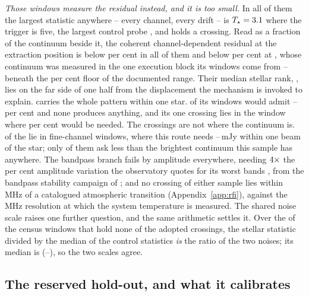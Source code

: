 \emph{Those windows measure the residual instead, and it is too small.} In
all \CxNAdmit{} of them the largest statistic anywhere -- every channel,
every drift -- is $T_\star=3.1$ where the trigger is five, the
largest control probe \CxAdmitCtrlHi, and \CxAdmitNCrossWord{} holds a
crossing. Read as
a fraction of the continuum beside it, the coherent channel-dependent
residual at the extraction position is below \CxResidHiPct{} per cent in all
of them and below \CxResidBestPct{} per cent at \CxResidBestStar, whose
continuum was measured in the one execution block its windows come from --
beneath the \CdSpecTsysLo{} per cent floor of the documented range. Their
median stellar rank, \CxAdmitRankMed, lies on the far side of one half from
the displacement the mechanism is invoked to explain. \CxOneStar{} carries
the whole pattern within one star. \CxOneStarNAdmit{} of its windows would
admit \CxOneStarEpsLoPct--\CxOneStarEpsHiPct{} per cent and none produces
anything, and its one crossing lies in the window where
\CxOneStarCrossEpsPct{} per cent would be needed. The crossings are not
where the continuum is. \CxNCrossFine{} of the \CxNCrossWin{} lie in
fine-channel windows, where this route needs
\CxCrossNeedLo--\CxCrossNeedHi\,mJy within one beam of the star; only
\CxCrossNeedNBelow{} of them ask less than the brightest continuum this
sample has anywhere. The bandpass branch fails by amplitude everywhere, needing
$4\times$ the \CdSpecBpWorst{} per cent amplitude variation the
observatory quotes for its worst bands \citep{ALMAKBBandpass}, from the
bandpass stability campaign of \citet{ALMATechNote15}; and no crossing of either sample
lies within
\TlOffMin\,MHz of a catalogued atmospheric transition
(Appendix~\ref{app:rfi}), against the \CdSpecTsysRes\,MHz resolution at which
the system temperature is measured. The shared noise scale raises one
further question, and the same arithmetic settles it. Over the \NsrNWin{} of
the \NWindows{} census windows that hold none of the adopted crossings, the
stellar statistic divided by the median of the \NCtrl{} control statistics
\emph{is} the ratio of the two noises; its median is \NsrMed{}
(\NsrLo--\NsrHi), so the two scales agree.

\subsection{The reserved hold-out, and what it calibrates}
\label{sec:heldout}

